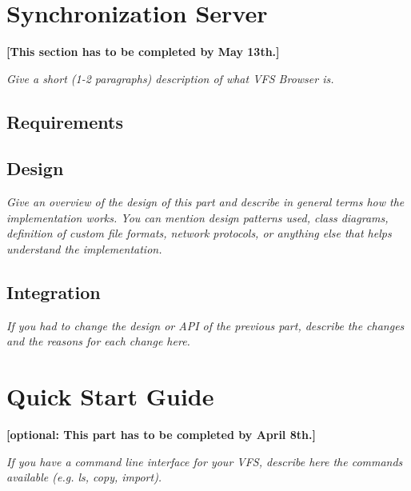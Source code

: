 \documentclass[a4paper,12pt]{article}
\begin{document}

\section{Synchronization Server}

\textbf{[This section has to be completed by May 13th.]}

\emph{Give a short (1-2 paragraphs) description of what VFS Browser is.}


\subsection{Requirements}

\subsection{Design}

\emph{Give an overview of the design of this part and describe in general terms how the implementation works. You can mention design patterns used, class diagrams, definition of custom file formats, network protocols, or anything else that helps understand the implementation.}


\subsection{Integration}

\emph{If you had to change the design or API of the previous part, describe the changes and the reasons for each change here.}




\section{Quick Start Guide}

\textbf{[optional: This part has to be completed by April 8th.]}

\emph{If you have a command line interface for your VFS, describe here the commands available (e.g. ls, copy, import).} \\ \\ \\
\end{document}
